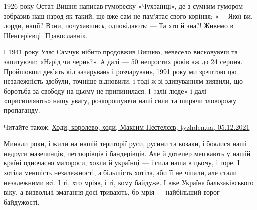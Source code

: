 1926 року Остап Вишня написав гумореску «Чухраїнці», де з сумним гумором
зобразив наш народ як такий, що вже сам не пам’ятає свого коріння: «— Якої ви,
лорди, нації? Вони, почухавшись, одповідають: — Та хто й зна?! Живемо в
Шенгерієвці. Православні».

І 1941 року Улас Самчук нібито продовжив Вишню, невесело висновуючи та
запитуючи: «Нарід чи чернь?». А далі — 50 непростих років аж до 24 серпня.
Пройшовши дев’ять кіл зачарувань і розчарувань, 1991 року ми зрештою цю
незалежність здобули, точніше відновили, і тоді ж зі здивуванням виявили, що
боротьба за свободу на цьому не припинилася. І «злії люде» і далі «присипляють»
нашу увагу, розпорошуючи наші сили та ширячи зловорожу пропаганду.

Читайте також: \href{https://tyzhden.ua/Columns/50/250443}{Ходи, королево, ходи, Максим Нестелєєв, tyzhden.ua, 05.12.2021}

Минали роки, і жили на нашій території руси, русини та козаки, і боялися наші
недруги мазепинців, петлюрівців і бандерівців. Але й дотепер мешкають у нашій
країні одночасно малороси, хохли й українці — і сила наша в цьому, і горе. І
хотіла меншість незалежності, а більшість хотіла, аби її не чіпали, але стали
незалежними всі. І ті, хто мріяв, і ті, кому байдуже. І вже Україна
бальзаківського віку, а визвольні змагання досі тривають, бо мрія — найбільший
ворог байдужості. 
